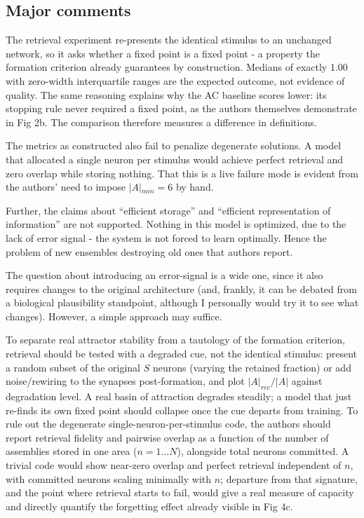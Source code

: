 \documentclass[a4paper, 11pt]{article}
\begin{document}
\subsection*{Major comments}
The retrieval experiment re-presents the identical stimulus to an unchanged network, so it asks whether a fixed point is a fixed point - a property the formation criterion already guarantees by construction. Medians of exactly 1.00 with zero-width interquartile ranges are the expected outcome, not evidence of quality. The same reasoning explains why the AC baseline scores lower: its stopping rule never required a fixed point, as the authors themselves demonstrate in Fig 2b. The comparison therefore measures a difference in definitions.

The metrics as constructed also fail to penalize degenerate solutions. A model that allocated a single neuron per stimulus would achieve perfect retrieval and zero overlap while storing nothing. That this is a live failure mode is evident from the authors' need to impose $\vert{}A\vert{}_{min} = 6$ by hand.

Further, the claims about ``efficient storage'' and ``efficient representation of information'' are not supported. Nothing in this model is optimized, due to the lack of error signal - the system is not forced to learn optimally. Hence the problem of new ensembles destroying old ones that authors report.

The question about introducing an error-signal is a wide one, since it also requires changes to the original architecture (and, frankly, it can be debated from a biological plausibility standpoint, although I personally would try it to see what changes). However, a simple approach may suffice.

To separate real attractor stability from a tautology of the formation criterion, retrieval should be tested with a degraded cue, not the identical stimulus: present a random subset of the original $S$ neurons (varying the retained fraction) or add noise/rewiring to the synapses post-formation, and plot $|A|_{rec}/|A|$ against degradation level. A real basin of attraction degrades steadily; a model that just re-finds its own fixed point should collapse once the cue departs from training. To rule out the degenerate single-neuron-per-stimulus code, the authors should report retrieval fidelity and pairwise overlap as a function of the number of assemblies stored in one area ($n = 1\dots N$), alongside total neurons committed. A trivial code would show near-zero overlap and perfect retrieval independent of $n$, with committed neurons scaling minimally with $n$; departure from that signature, and the point where retrieval starts to fail, would give a real measure of capacity and directly quantify the forgetting effect already visible in Fig 4c.
\end{document}
